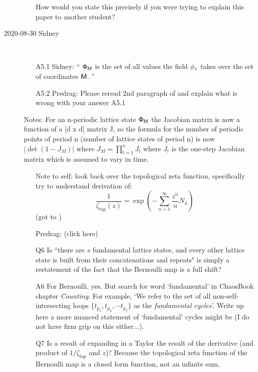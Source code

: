 \begin{description}
\begin{itemize}
How would you state this precisely if you were trying to explain this
paper to another student?
\end{itemize}

\item[2020-08-30 Sidney]~~
\begin{itemize}
  \item[A5.1]
Sidney: ``
$\mathsf{\Phi}_{\mathsf{M}}$ is the set of all values the field $\phi_z$ takes over
the set of coordinates $\mathsf{M}$.
''
  \item[A5.2]
Predrag: Please reread 2nd paragraph of  and explain what
is wrong with your answer A5.1
\end{itemize}

\vspace{3mm}

Notes: For an n-periodic lattice state $\mathsf{\Phi}_{\mathsf{M}}$ the Jacobian
matrix is now a function of a [d x d] matrix J, so the formula for the
number of periodic points of period n (number of lattice states of period
n) is now $|\det(1-J_M)|$ where $J_M=\prod^n_{t=1}J_t$ where $J_t$ is the
one-step Jacobian matrix which is assumed to vary in time.

\begin{itemize}
	\item[Note to self:]
look back over the topological zeta function, specifically try to
understand derivation of:
\[
\frac{1}{\zeta_{top}(z)}=\exp\left(-\sum^{\infty}_{n=1}\frac{z^n}{n}N_n\right)
\]
(got to )
	\item[Predrag:]
 {(click here)}
	\item[Q6]
Is ``there are ${s}$ fundamental lattice states, and every other lattice state
is built from their concatenations and repeats"
is simply a restatement of the fact that the Bernoulli map is a full shift?
	\item[A6]
For Bernoulli, yes. But search for word `fundamental' in ChaosBook
chapter 
{{\em Counting}}. For example, `We refer to the set of all
non-self-intersecting loops $\{ t_{p_1}, t_{p_2}, \cdots t_{p_f} \}$ as
the {\em fundamental cycles}'. Write up here a more nuanced statement of
`fundamental' cycles might be (I do not have firm grip on this either...).
	\item[Q7]
Is  a result of expanding in a Taylor the result of the derivative (and product of $1/\zeta_{top}$ and $z$)? Because the topological zeta function of the Bernoulli map is a closed form function, not an infinite sum.
\end{itemize}


\end{description}
